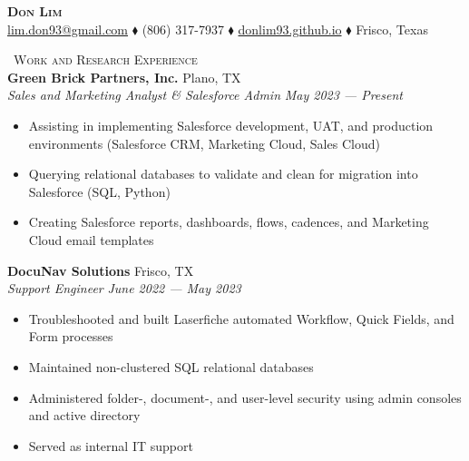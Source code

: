 \documentclass[a4paper,11pt]{article}
\newcommand{\header} [1] {
    \vspace{1mm}
    {\textsc{\large{\xrfill[0.5ex]{0.5pt}~#1~\xrfill[0.5ex]{0.5pt}}}} %
}
\begin{document}
\vspace*{-50pt}
\fontsize{10.5}{12}\selectfont


\vspace*{1mm}
\begin{center}
    {\Huge\textbf\textsc{{{Don Lim}}}}\\ \vspace{1mm}
    \href{mailto:lim.don93@gmail.com}{\Letter\space lim.don93@gmail.com} $\blacklozenge$  \Mobilefone\space (806) 317-7937 $\blacklozenge$ \href{https://donlim93.github.io/}{\faGlobe\space donlim93.github.io} $\blacklozenge$ Frisco, Texas \\
\end{center}
\vspace*{-1mm}

\header{Work and Research Experience} \\
\vspace{1mm}
\textbf{Green Brick Partners, Inc.} \hfill Plano, TX \\
\textit{Sales and Marketing Analyst \& Salesforce Admin} \hfill  \emph{May 2023 --- Present} \\
\begin{itemize}
    \item Assisting in implementing Salesforce development, UAT, and production environments (Salesforce CRM, Marketing Cloud, Sales Cloud) 
    \item Querying relational databases to validate and clean for migration into Salesforce (SQL, Python)
    \item Creating Salesforce reports, dashboards, flows, cadences, and Marketing Cloud email templates
\end{itemize}
\vspace{1mm}

\textbf{DocuNav Solutions} \hfill Frisco, TX \\
\textit{Support Engineer} \hfill  \emph{June 2022 --- May 2023} \\
\begin{itemize}
    \item Troubleshooted and built Laserfiche automated Workflow, Quick Fields, and Form processes
    \item Maintained non-clustered SQL relational databases
    \item Administered folder-, document-, and user-level security using admin consoles and active directory
    \item Served as internal IT support
\end{itemize}    
\vspace{1mm}
\end{document}
